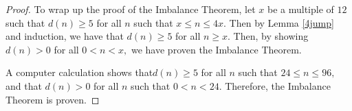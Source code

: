 \documentclass{article}
\begin{document}
\begin{proof}
To wrap up the proof of the Imbalance Theorem, let $x$ be a multiple of $12$ such that $d(n) \geq 5$ for all $n$ such that $x \leq n \leq 4x.$ Then by Lemma \ref{4jump} and induction, we have that $d(n) \geq 5$ for all $n \geq x.$ Then, by showing $d(n) > 0$ for all $0 < n < x,$ we have proven the Imbalance Theorem.

A computer calculation shows that$d(n) \geq 5$ for all $n$ such that $24 \leq n \leq 96,$ and that $d(n) > 0$ for all $n$ such that $0 < n < 24.$ Therefore, the Imbalance Theorem is proven.
\end{proof}
\end{document}
